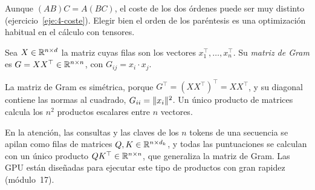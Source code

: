 Aunque $(AB)C=A(BC)$, el coste de los dos órdenes puede ser muy distinto (ejercicio~\ref{eje:4-coste}). Elegir bien el orden de los paréntesis es una optimización habitual en el cálculo con tensores.

\begin{definicion}\label{def:gram}
Sea $X\in\mathbb{R}^{n\times d}$ la matriz cuyas filas son los vectores $x_1^{\top},\dots,x_n^{\top}$. Su \emph{matriz de Gram} es $G=XX^{\top}\in\mathbb{R}^{n\times n}$, con $G_{ij}=x_i\cdot x_j$.
\end{definicion}

La matriz de Gram es simétrica, porque $G^{\top}=(XX^{\top})^{\top}=XX^{\top}$, y su diagonal contiene las normas al cuadrado, $G_{ii}=\lVert x_i\rVert^{2}$. Un único producto de matrices calcula los $n^{2}$ productos escalares entre $n$ vectores.

\addtocounter{definicion}{1}%

\begin{observacion}
En la atención, las consultas y las claves de los $n$ tokens de una secuencia se apilan como filas de matrices $Q,K\in\mathbb{R}^{n\times d_k}$, y todas las puntuaciones se calculan con un único producto $QK^{\top}\in\mathbb{R}^{n\times n}$, que generaliza la matriz de Gram. Las GPU están diseñadas para ejecutar este tipo de productos con gran rapidez (módulo~17).
\end{observacion}

